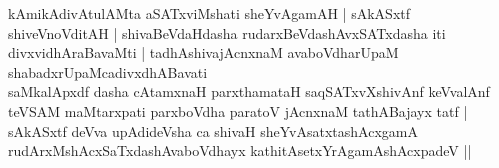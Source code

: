 \begin{entry}
\end{entry}

\begin{entry}

\smallskip
\begin{shl}
kAmikAdivAtulAMta aSATxviMshati sheYvAgamAH | sAkASxtf\\
shiveVnoVditAH | shivaBeVdaHdasha rudarxBeVdashAvxSATxdasha iti\\
divxvidhAraBavaMti | tadhAshivajAcnxnaM avaboVdharUpaM shabadxrUpaMcadivxdhABavati\\
saMkalApxdf dasha cAtamxnaH parxthamataH saqSATxvXshivAnf keVvalAnf\\
teVSAM maMtarxpati parxboVdha paratoV jAcnxnaM tathABajayx tatf |\\
sAkASxtf deVva upAdideVsha ca shivaH sheYvAsatxtashAcxgamA\\
rudArxMshAcxSaTxdashAvaboVdhayx kathitAsetxYrAgamAshAcxpadeV || 
\end{shl}
\medskip
{}


\end{entry}
